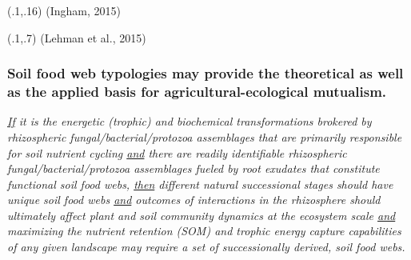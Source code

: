\documentclass[
paper=128mm:96mm, %
fontsize=11pt, %
pagesize, %
parskip=half-, %
]{scrartcl}
\theoremstyle{mythmstyle} %
\begin{document}
\begin{textblock}{1}(.1,.16)
  \footnotesize {(Ingham, 2015)}
 \end{textblock}
\clearpage



 
 \begin{textblock}{1}(.1,.7)
  \small {(Lehman et al., 2015)}
 \end{textblock}

\clearpage

\subsubsection{Soil food web typologies may provide the theoretical as well as the applied basis for agricultural-ecological mutualism. }
\textit{\underline{If} it is the energetic (trophic) and biochemical transformations brokered by rhizospheric fungal/bacterial/protozoa assemblages that are primarily responsible for soil nutrient cycling \underline{and} there are readily identifiable rhizospheric fungal/bacterial/protozoa assemblages fueled by root exudates that constitute functional soil food webs, \underline{then} different natural successional stages should have unique soil food webs \underline{and} outcomes of interactions in the rhizosphere should ultimately affect plant and soil community dynamics at the ecosystem scale \underline{and} maximizing the nutrient retention (SOM) and trophic energy capture capabilities of any given landscape may require a set of successionally derived, soil food webs.}
\end{document}
